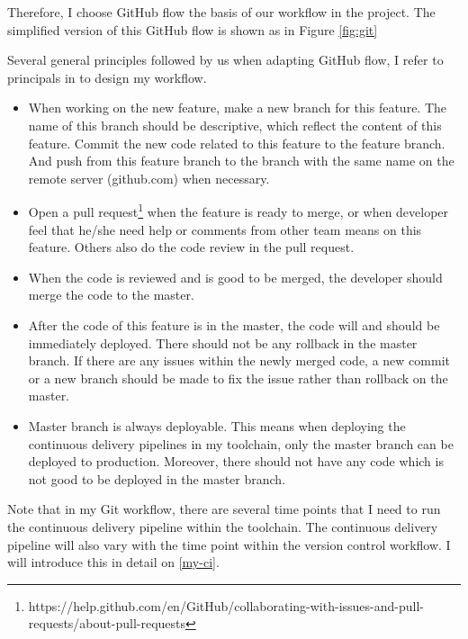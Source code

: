 Therefore, I choose GitHub flow \cite{chacongithub} the basis of our workflow in the project. The simplified version of this GitHub flow is shown as in Figure \ref{fig:git} 
\par
Several general principles followed by us when adapting GitHub flow, I refer to principals in \cite{chacongithub} to design my workflow.
\begin{itemize}
\item When working on the new feature, make a new branch for this feature. The name of this branch should be descriptive, which reflect the content of this feature. Commit the new code related to this feature to the feature branch. And push from this feature branch to the branch with the same name on the remote server (github.com) when necessary.
\item Open a pull request\footnote{https://help.github.com/en/GitHub/collaborating-with-issues-and-pull-requests/about-pull-requests} when the feature is ready to merge, or when developer feel that he/she need help or comments from other team means on this feature. Others also do the code review in the pull request.
\item When the code is reviewed and is good to be merged, the developer should merge the code to the master.
\item After the code of this feature is in the master, the code will and should be immediately deployed. There should not be any rollback in the master branch. If there are any issues within the newly merged code, a new commit or a new branch should be made to fix the issue rather than rollback on the master.
\item Master branch is always deployable. This means when deploying the continuous delivery pipelines in my toolchain, only the master branch can be deployed to production. Moreover, there should not have any code which is not good to be deployed in the master branch.
\end{itemize}
\par
Note that in my Git workflow, there are several time points that I need to run the continuous delivery pipeline within the toolchain. The continuous delivery pipeline will also vary with the time point within the version control workflow. I will introduce this in detail on \ref{my-ci}.
